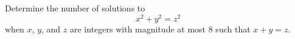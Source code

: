 Determine the number of solutions to \[x^2+y^2=z^2\] when $x$, $y$, and $z$ are integers with magnitude at most $8$ such that $x+y=z$.
